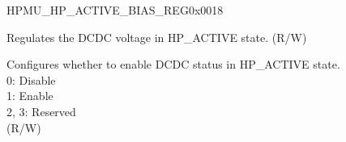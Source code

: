 \begin{register}{H}{PMU\_HP\_ACTIVE\_BIAS\_REG}{0x0018}\label{regdesc:PMUHPACTIVEBIASREG}
%
%
%
%
\regnewline%
\begin{regdesc}\begin{reglist}
\label{fielddesc:PMUHPACTIVEDCMVSET}\item [PMU\_HP\_ACTIVE\_DCM\_VSET]  Regulates the DCDC voltage in HP\_ACTIVE state. (R/W)   \label{fielddesc:PMUHPACTIVEDCMMODE}\item [PMU\_HP\_ACTIVE\_DCM\_MODE] Configures whether to enable DCDC status in HP\_ACTIVE state.\\
0: Disable \\
1: Enable \\
2, 3: Reserved\\
(R/W)

\end{reglist}\end{regdesc}
\end{register}


